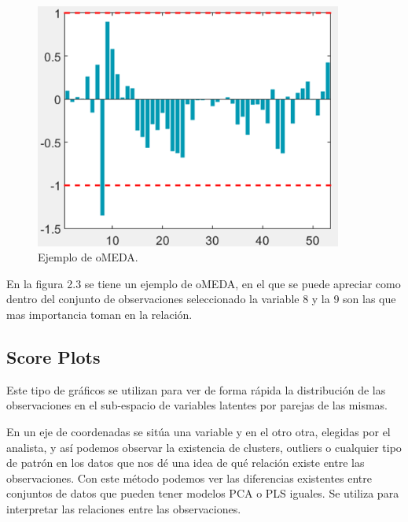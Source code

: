\begin{figure}[H]
\centering
\includegraphics[width=0.9\textwidth]{imagenes/figuras/2_4.png}
\caption{Ejemplo de oMEDA.}
\end{figure}

\bigskip

En la figura 2.3 se tiene un ejemplo de oMEDA, en el que se puede apreciar como dentro del conjunto de observaciones seleccionado la variable 8 y la 9 son las que mas importancia toman en la relación.

\subsection{Score Plots}

Este tipo de gráficos se utilizan para ver de forma rápida la distribución de las observaciones en el sub-espacio de variables latentes por parejas de las mismas. 
\bigskip

En un eje de coordenadas se sitúa una variable y en el otro otra, elegidas por el analista, y así podemos observar la existencia de clusters, outliers o cualquier tipo de patrón en los datos que nos dé una idea de qué relación existe entre las observaciones. Con este método podemos ver las diferencias existentes entre conjuntos de datos que pueden tener modelos PCA o PLS iguales. Se utiliza para interpretar las relaciones entre las observaciones.

